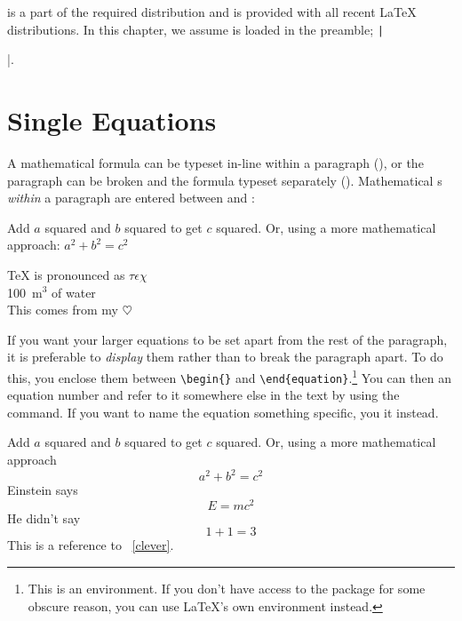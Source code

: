  is a part of the required distribution and is provided
with all recent \LaTeX{} distributions. In this chapter, we assume
 is loaded in the preamble; \texttt|\usepackage{amsmath}|.

\section{Single Equations}

A mathematical formula can be typeset in-line within a paragraph (\emph{}), or the paragraph can be broken and the formula typeset separately
(\emph{}). Mathematical s
\emph{within} a paragraph are entered
between \ai{\$} and \ai{\$}:
\begin{example}
Add $a$ squared and $b$ squared
to get $c$ squared. Or, using 
a more mathematical approach:
$a^2 + b^2 = c^2$
\end{example}
\begin{example}
\TeX{} is pronounced as 
$\tau\epsilon\chi$\\[5pt]
100~m$^{3}$ of water\\[5pt]
This comes from my $\heartsuit$
\end{example}

If you want your larger equations to be set apart
from the rest of the paragraph, it is preferable to \emph{display} them
rather than to break the paragraph apart.
To do this, you enclose them between \verb|\begin{|\verb|}| and
\verb|\end{equation}|.\footnote{This is an  environment. If you don't
  have access to the package for some obscure reason, you can use \LaTeX's own
   environment instead.} You can then  an equation number and refer to
it somewhere else in the text by using the  command. If you want to
name the equation something specific, you  it instead.
\begin{example}
Add $a$ squared and $b$ squared
to get $c$ squared. Or, using
a more mathematical approach
 \begin{equation}
   a^2 + b^2 = c^2
 \end{equation}
Einstein says
 \begin{equation}
   E = mc^2 \label{clever}
 \end{equation}
He didn't say
 \begin{equation}
  1 + 1 = 3 \tag{dumb}
 \end{equation}
This is a reference to%
~\eqref{clever}. 
\end{example}

